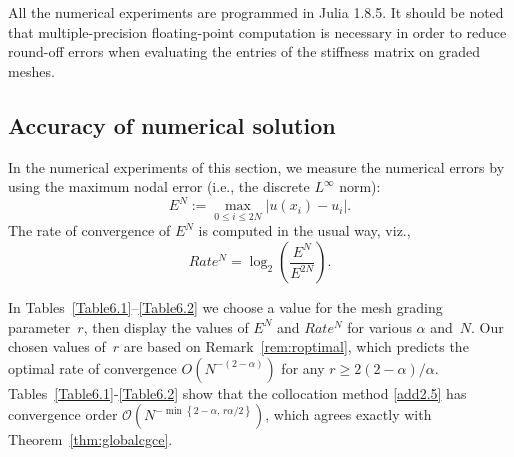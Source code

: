 \documentclass[smallextended]{svjour3}       %
\begin{document}
All the numerical experiments are programmed in Julia 1.8.5.
It should be noted that multiple-precision floating-point computation is necessary in order to reduce round-off errors when evaluating
the entries of the stiffness matrix on graded meshes.


\subsection{Accuracy of numerical solution}
In the numerical experiments of this section, we measure the numerical errors by using the maximum nodal error 
(i.e., the discrete $L^\infty$ norm):
\[  E^{N} := \max_{0\leq i\leq 2N} | u(x_{i})-u_{i}|. \]
The rate of convergence of  $E^N$ is computed in the usual way, viz.,  
\[  	 Rate^N =\log_2 \left( \frac{E^N}{E^{2N}} \right). \]


In Tables~\ref{Table6.1}--\ref{Table6.2} we choose a value for the mesh grading parameter~$r$, then display the values of $E^N$ and $Rate^N$ for various $\alpha$ and~$N$. Our chosen values of~$r$ are based on Remark~\ref{rem:roptimal}, which predicts the optimal rate of convergence $O(N^{-(2-\alpha)})$ for any $r\ge 2(2-\alpha)/\alpha$. 
Tables~\ref{Table6.1}-\ref{Table6.2}   show that the collocation method \eqref{add2.5} has convergence order $\mathcal{O}\left(N^{-\min\left\{2-\alpha,\, r\alpha/2\right\}}\right)$, which agrees exactly with Theorem~\ref{thm:globalcgce}.
\end{document}
